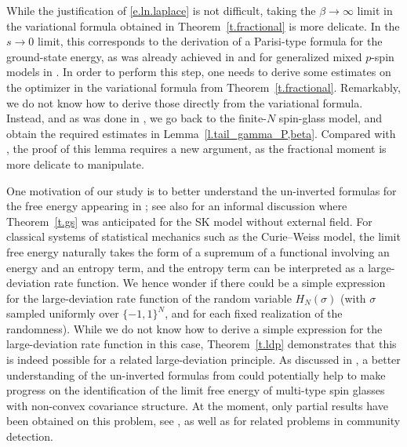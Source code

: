 \documentclass[11pt]{amsart}
\theoremstyle{remark}
\theoremstyle{definition}
\numberwithin{equation}{section}
\numberwithin{proposition}{section}
\numberwithin{figure}{section}
\numberwithin{table}{section}
\newcommand{\1}{\mathbf{1}}
\begin{document}
While the justification of \eqref{e.ln.laplace} is not difficult, taking the $\beta \to \infty$ limit in the variational formula obtained in Theorem~\ref{t.fractional} is more delicate. In the $s \to 0$ limit, this corresponds to the derivation of a Parisi-type formula for the ground-state energy, as was already achieved in \cite{auffinger2017parisi} and for generalized mixed $p$-spin models in \cite{JagSenGround, grantGround}. In order to perform this step, one needs to derive some estimates on the optimizer in the variational formula from Theorem~\ref{t.fractional}. Remarkably, we do not know how to derive those directly from the variational formula. Instead, and as was done in \cite{auffinger2017parisi}, we go back to the finite-$N$ spin-glass model, and obtain the required estimates in Lemma~\ref{l.tail_gamma_P,beta}. Compared with \cite{auffinger2017parisi}, the proof of this lemma requires a new argument, as the fractional moment is more delicate to manipulate.

One motivation of our study is to better understand the un-inverted formulas for the free energy appearing in \cite{chen2025convex, issa2024hopf, mourrat2025uninverting}; see also \cite{mourrat2025spin} for an informal discussion where Theorem~\ref{t.gs} was anticipated for the SK model without external field. For classical systems of statistical mechanics such as the Curie--Weiss model, the limit free energy naturally takes the form of a supremum of a functional involving an energy and an entropy term, and the entropy term can be interpreted  as a large-deviation rate function. We hence wonder if there could be a simple expression for the large-deviation rate function of the random variable $H_N(\sigma)$ (with $\sigma$ sampled uniformly over $\{-1,1\}^N$, and for each fixed realization of the randomness). While we do not know how to derive a simple expression for the large-deviation rate function in this case, Theorem~\ref{t.ldp} demonstrates that this is indeed possible for a related large-deviation principle. As discussed in \cite{mourrat2025spin}, a better understanding of the un-inverted formulas from \cite{chen2025convex, issa2024hopf, mourrat2025uninverting} could potentially help to make progress on the identification of the limit free energy of multi-type spin glasses with non-convex covariance structure. At the moment, only partial results have been obtained on this problem, see \cite{chen2025free, chen2025hamilton, mourrat2020nonconvex, mourrat2023free}, as well as \cite{sparse_PDE, sparse_prob, mutual_information} for related problems in community detection.
\end{document}
